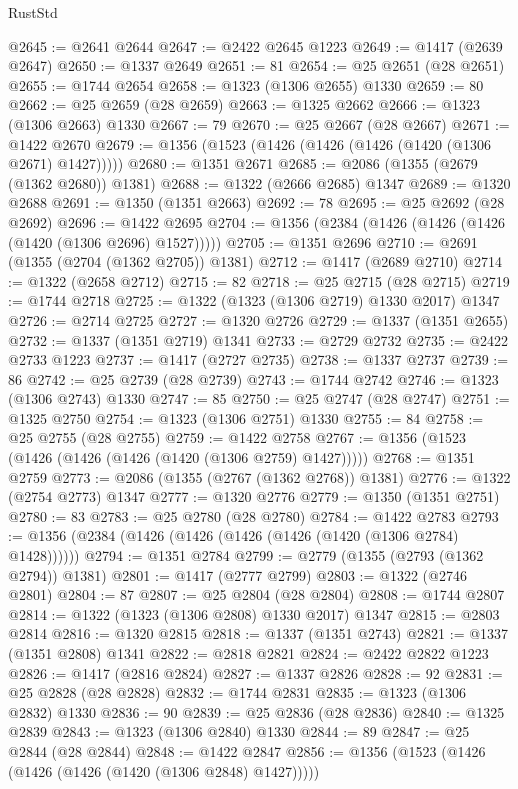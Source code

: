 \begin{lexlean}{RustStd}
\begin{coremodule}
@2645 := @2641 @2644
@2647 := @2422 @2645 @1223
@2649 := @1417 (@2639 @2647)
@2650 := @1337 @2649
@2651 := 81
@2654 := @25 @2651 (@28 @2651)
@2655 := @1744 @2654
@2658 := @1323 (@1306 @2655) @1330
@2659 := 80
@2662 := @25 @2659 (@28 @2659)
@2663 := @1325 @2662
@2666 := @1323 (@1306 @2663) @1330
@2667 := 79
@2670 := @25 @2667 (@28 @2667)
@2671 := @1422 @2670
@2679 := @1356 (@1523 (@1426 (@1426 (@1426 (@1420 (@1306 @2671) @1427)))))
@2680 := @1351 @2671
@2685 := @2086 (@1355 (@2679 (@1362 @2680)) @1381)
@2688 := @1322 (@2666 @2685) @1347
@2689 := @1320 @2688
@2691 := @1350 (@1351 @2663)
@2692 := 78
@2695 := @25 @2692 (@28 @2692)
@2696 := @1422 @2695
@2704 := @1356 (@2384 (@1426 (@1426 (@1426 (@1420 (@1306 @2696) @1527)))))
@2705 := @1351 @2696
@2710 := @2691 (@1355 (@2704 (@1362 @2705)) @1381)
@2712 := @1417 (@2689 @2710)
@2714 := @1322 (@2658 @2712)
@2715 := 82
@2718 := @25 @2715 (@28 @2715)
@2719 := @1744 @2718
@2725 := @1322 (@1323 (@1306 @2719) @1330 @2017) @1347
@2726 := @2714 @2725
@2727 := @1320 @2726
@2729 := @1337 (@1351 @2655)
@2732 := @1337 (@1351 @2719) @1341
@2733 := @2729 @2732
@2735 := @2422 @2733 @1223
@2737 := @1417 (@2727 @2735)
@2738 := @1337 @2737
@2739 := 86
@2742 := @25 @2739 (@28 @2739)
@2743 := @1744 @2742
@2746 := @1323 (@1306 @2743) @1330
@2747 := 85
@2750 := @25 @2747 (@28 @2747)
@2751 := @1325 @2750
@2754 := @1323 (@1306 @2751) @1330
@2755 := 84
@2758 := @25 @2755 (@28 @2755)
@2759 := @1422 @2758
@2767 := @1356 (@1523 (@1426 (@1426 (@1426 (@1420 (@1306 @2759) @1427)))))
@2768 := @1351 @2759
@2773 := @2086 (@1355 (@2767 (@1362 @2768)) @1381)
@2776 := @1322 (@2754 @2773) @1347
@2777 := @1320 @2776
@2779 := @1350 (@1351 @2751)
@2780 := 83
@2783 := @25 @2780 (@28 @2780)
@2784 := @1422 @2783
@2793 := @1356 (@2384 (@1426 (@1426 (@1426 (@1426 (@1420 (@1306 @2784) @1428))))))
@2794 := @1351 @2784
@2799 := @2779 (@1355 (@2793 (@1362 @2794)) @1381)
@2801 := @1417 (@2777 @2799)
@2803 := @1322 (@2746 @2801)
@2804 := 87
@2807 := @25 @2804 (@28 @2804)
@2808 := @1744 @2807
@2814 := @1322 (@1323 (@1306 @2808) @1330 @2017) @1347
@2815 := @2803 @2814
@2816 := @1320 @2815
@2818 := @1337 (@1351 @2743)
@2821 := @1337 (@1351 @2808) @1341
@2822 := @2818 @2821
@2824 := @2422 @2822 @1223
@2826 := @1417 (@2816 @2824)
@2827 := @1337 @2826
@2828 := 92
@2831 := @25 @2828 (@28 @2828)
@2832 := @1744 @2831
@2835 := @1323 (@1306 @2832) @1330
@2836 := 90
@2839 := @25 @2836 (@28 @2836)
@2840 := @1325 @2839
@2843 := @1323 (@1306 @2840) @1330
@2844 := 89
@2847 := @25 @2844 (@28 @2844)
@2848 := @1422 @2847
@2856 := @1356 (@1523 (@1426 (@1426 (@1426 (@1420 (@1306 @2848) @1427)))))

\end{coremodule}
\end{lexlean}

